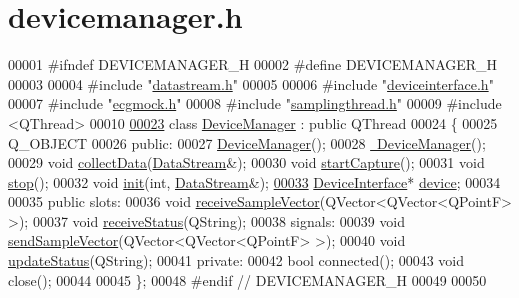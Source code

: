 \hypertarget{devicemanager_8h_source}{}\section{devicemanager.\+h}
\label{devicemanager_8h_source}

\begin{DoxyCode}
00001 \textcolor{preprocessor}{#ifndef DEVICEMANAGER\_H}
00002 \textcolor{preprocessor}{#define DEVICEMANAGER\_H}
00003 
00004 \textcolor{preprocessor}{#include "\hyperlink{datastream_8h}{datastream.h}"}
00005 
00006 \textcolor{preprocessor}{#include "\hyperlink{deviceinterface_8h}{deviceinterface.h}"}
00007 \textcolor{preprocessor}{#include "\hyperlink{ecgmock_8h}{ecgmock.h}"}
00008 \textcolor{preprocessor}{#include "\hyperlink{samplingthread_8h}{samplingthread.h}"}
00009 \textcolor{preprocessor}{#include <QThread>}
00010 
\hypertarget{devicemanager_8h_source.tex_l00023}{}\hyperlink{classDeviceManager}{00023} \textcolor{keyword}{class }\hyperlink{classDeviceManager}{DeviceManager} : \textcolor{keyword}{public} QThread
00024 \{
00025     Q\_OBJECT
00026 \textcolor{keyword}{public}:
00027     \hyperlink{classDeviceManager_a4e6d37b581df235b46c5696e6c71ae79}{DeviceManager}();
00028     \hyperlink{classDeviceManager_ad91a247c8acfd51c533be52313ce7ddd}{~DeviceManager}();
00029     \textcolor{keywordtype}{void} \hyperlink{classDeviceManager_a322e3bd6b6f57692116b6af7b9a57a9a}{collectData}(\hyperlink{classDataStream}{DataStream}&); 
00030     \textcolor{keywordtype}{void} \hyperlink{classDeviceManager_a30358705658f1037ef6bb98e7a2d5e80}{startCapture}(); 
00031     \textcolor{keywordtype}{void} \hyperlink{classDeviceManager_a8569742b2eb08d95052506e372b6bd31}{stop}(); 
00032     \textcolor{keywordtype}{void} \hyperlink{classDeviceManager_a280116304655de3a0bbfbf49730f9384}{init}(\textcolor{keywordtype}{int}, \hyperlink{classDataStream}{DataStream}&); 
\hypertarget{devicemanager_8h_source.tex_l00033}{}\hyperlink{classDeviceManager_aa916ac4224ab9a874e6242c0a9f50a56}{00033}     \hyperlink{classDeviceInterface}{DeviceInterface}* \hyperlink{classDeviceManager_aa916ac4224ab9a874e6242c0a9f50a56}{device}; 
00034 
00035 \textcolor{keyword}{public} slots:
00036     \textcolor{keywordtype}{void} \hyperlink{classDeviceManager_a14f86d572f6ea7222032ec00499a16a8}{receiveSampleVector}(QVector<QVector<QPointF> >);  
00037     \textcolor{keywordtype}{void} \hyperlink{classDeviceManager_aa7b96de52a17b961688e81f5e999da74}{receiveStatus}(QString);  
00038 signals:
00039     \textcolor{keywordtype}{void} \hyperlink{classDeviceManager_a7f0794801ee0b28c74a253f3c2cf5659}{sendSampleVector}(QVector<QVector<QPointF> >); 
00040     \textcolor{keywordtype}{void} \hyperlink{classDeviceManager_a68b6e3b924cacf0a5cde44d02eb49d0c}{updateStatus}(QString);  
00041 \textcolor{keyword}{private}:
00042      \textcolor{keywordtype}{bool} connected(); 
00043          \textcolor{keywordtype}{void} close(); 
00044 
00045 \};
00048 \textcolor{preprocessor}{#endif // DEVICEMANAGER\_H}
00049 
00050 
\end{DoxyCode}
